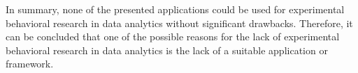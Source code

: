 In summary, none of the presented applications could be used for experimental behavioral research in data analytics without significant drawbacks. Therefore, it can be concluded that one of the possible reasons for the lack of experimental behavioral research in data analytics is the lack of a suitable application or framework.
